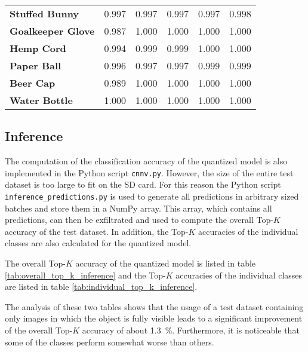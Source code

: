 \begin{table}
\begin{tabular}{llllll}
    \textbf{Stuffed Bunny} & \num{0.997} & \num{0.997} & \num{0.997} & \num{0.997} & \num{0.998} \\
    \textbf{Goalkeeper Glove} & \num{0.987} & \num{1.000} & \num{1.000} & \num{1.000} & \num{1.000} \\
    \textbf{Hemp Cord} & \num{0.994} & \num{0.999} & \num{0.999} & \num{1.000} & \num{1.000} \\
    \textbf{Paper Ball} & \num{0.996} & \num{0.997} & \num{0.997} & \num{0.999} & \num{0.999} \\
    \textbf{Beer Cap} & \num{0.989} & \num{1.000} & \num{1.000} & \num{1.000} & \num{1.000} \\
    \textbf{Water Bottle} & \num{1.000} & \num{1.000} & \num{1.000} & \num{1.000} & \num{1.000} \\
    \bottomrule
  \end{tabular}
\end{table}

\subsection{Inference}
\label{subsec:verification_and_benchmark:classification_performance:inference}

The computation of the classification accuracy of the quantized model is also implemented in the Python script \texttt{cnnv.py}.
However, the size of the entire test dataset is too large to fit on the SD card.
For this reason the Python script \texttt{inference\_predictions.py} is used to generate all predictions in arbitrary sized batches and store them in a NumPy array.
This array, which contains all predictions, can then be exfiltrated and used to compute the overall Top-$K$ accuracy of the test dataset.
In addition, the Top-$K$ accuracies of the individual classes are also calculated for the quantized model.

The overall Top-$K$ accuracy of the quantized model is listed in table \ref{tab:overall_top_k_inference} and the Top-$K$ accuracies of the individual classes are listed in table \ref{tab:individual_top_k_inference}.

The analysis of these two tables shows that the usage of a test dataset containing only images in which the object is fully visible leads to a significant improvement of the overall Top-$K$ accuracy of about \SI{1.3}{\percent}.
Furthermore, it is noticeable that some of the classes perform somewhat worse than others.

